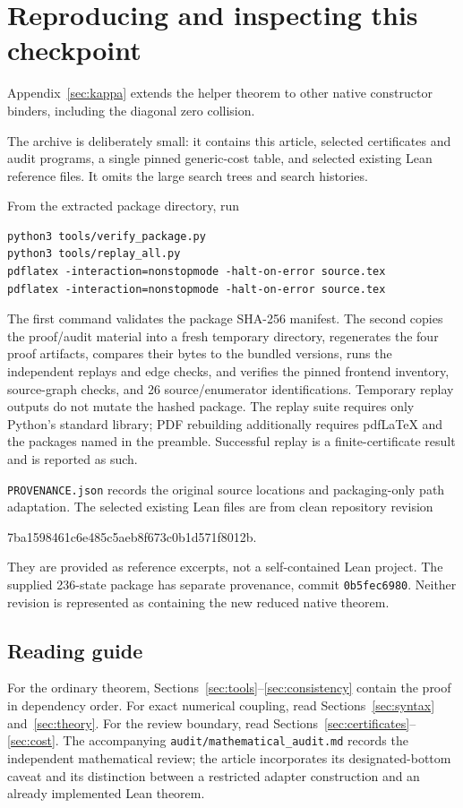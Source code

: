 \documentclass[11pt,letterpaper]{article}
\theoremstyle{definition}\newtheorem{definition}[theorem]{Definition}
\theoremstyle{remark}\newtheorem{remark}[theorem]{Remark}
\newcommand{\file}[1]{\begingroup\small\ttfamily\nolinkurl{#1}\endgroup}
\begin{document}
\section{Reproducing and inspecting this checkpoint}\label{sec:repro}
Appendix~\ref{sec:kappa} extends the helper theorem to other native constructor binders, including the diagonal zero collision.

The archive is deliberately small: it contains this article, selected certificates and audit programs, a single pinned generic-cost table, and selected existing Lean reference files. It omits the large search trees and search histories.

From the extracted package directory, run
\begin{lstlisting}
python3 tools/verify_package.py
python3 tools/replay_all.py
pdflatex -interaction=nonstopmode -halt-on-error source.tex
pdflatex -interaction=nonstopmode -halt-on-error source.tex
\end{lstlisting}
The first command validates the package SHA-256 manifest. The second copies the proof/audit material into a fresh temporary directory, regenerates the four proof artifacts, compares their bytes to the bundled versions, runs the independent replays and edge checks, and verifies the pinned frontend inventory, source-graph checks, and 26 source/enumerator identifications. Temporary replay outputs do not mutate the hashed package. The replay suite requires only Python's standard library; PDF rebuilding additionally requires pdfLaTeX and the packages named in the preamble. Successful replay is a finite-certificate result and is reported as such.

\file{PROVENANCE.json} records the original source locations and packaging-only path adaptation. The selected existing Lean files are from clean repository revision
\begin{center}\small\ttfamily
7ba1598461c6e485c5aeb8f673c0b1d571f8012b.
\end{center}
They are provided as reference excerpts, not a self-contained Lean project. The supplied 236-state package has separate provenance, commit \file{0b5fec6980}. Neither revision is represented as containing the new reduced native theorem.

\subsection*{Reading guide}
For the ordinary theorem, Sections~\ref{sec:tools}--\ref{sec:consistency} contain the proof in dependency order. For exact numerical coupling, read Sections~\ref{sec:syntax} and~\ref{sec:theory}. For the review boundary, read Sections~\ref{sec:certificates}--\ref{sec:cost}. The accompanying \file{audit/mathematical_audit.md} records the independent mathematical review; the article incorporates its designated-bottom caveat and its distinction between a restricted adapter construction and an already implemented Lean theorem.
\end{document}
